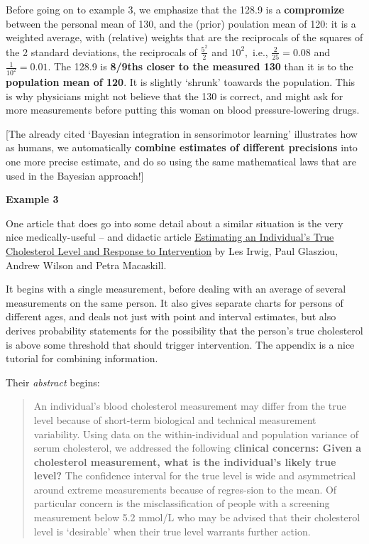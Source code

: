 \documentclass[]{book}
\begin{document}
Before going on to example 3, we emphasize that the 128.9 is a \textbf{compromize} between the personal mean of 130, and the (prior) poulation mean of 120: it is a weighted average, with (relative) weights that are the reciprocals of the squares of the 2 standard deviations, the reciprocals of \(\frac{5^2}{2}\) and \(10^2,\) i.e., \(\frac{2}{25} = 0.08\) and \(\frac{1}{10^2} = 0.01.\) The
128.9 is \textbf{8/9ths closer to the measured 130} than it is to the \textbf{population mean of 120}. It is slightly `shrunk' toawards the population. This is why physicians might not believe that the 130 is correct, and might ask for more measurements before putting this woman on blood pressure-lowering drugs.

{[}The already cited `Bayesian integration in sensorimotor learning' illustrates how as humans, we automatically \textbf{combine estimates of different precisions} into one more precise estimate, and do so using the same mathematical laws that are used in the Bayesian approach!{]}

\textbf{Example 3}

One article that does go into some detail about a similar situation is the very nice medically-useful -- and didactic article \href{http://www.medicine.mcgill.ca/epidemiology/hanley/bios601/ch10Bayes/Irwig-1991-cholesterol.pdf}{Estimating an Individual's True Cholesterol Level and Response to Intervention} by Les Irwig, Paul Glasziou, Andrew Wilson and Petra Macaskill.

It begins with a single measurement, before dealing with an average of several measurements on the same person. It also gives separate charts for persons of different ages, and deals not just with point and interval estimates, but also derives probability statements for the possibility that the person's true cholesterol is above some threshold that should trigger intervention. The appendix is a nice tutorial for combining information.

Their \emph{abstract} begins:

\begin{quote}
An individual's blood cholesterol measurement may differ from the true level because of short-term biological and technical measurement variability. Using data on the within-individual and population variance of serum cholesterol, we addressed the following \textbf{clinical concerns: Given a cholesterol measurement, what is the individual's likely true level?} The confidence interval for the true level is wide and asymmetrical around extreme measurements because of regres-sion to the mean. Of particular concern is the misclassification of people with a screening measurement below 5.2 mmol/L who may be advised that their cholesterol level is `desirable' when their true level warrants further action.
\end{quote}
\end{document}
